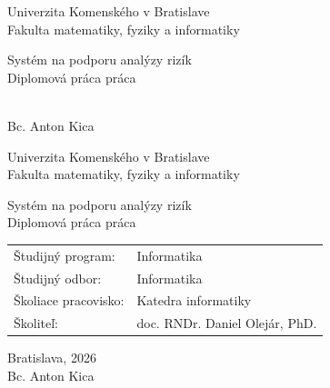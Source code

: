 \documentclass[12pt, twoside]{book}
\def\mfrok{2026}
\def\mfnazov{Systém na podporu analýzy rizík}
\def\mftyp{Diplomová práca práca}
\def\mfautor{Bc. Anton Kica}
\def\mfskolitel{doc. RNDr. Daniel Olejár, PhD.}
\def\mfmiesto{Bratislava, \mfrok}
\def\mfodbor{ Informatika }
\def\program{ Informatika }
\def\mfpracovisko{Katedra informatiky}
\begin{document}
     
\frontmatter
\pagestyle{empty}


\begin{center}
\sc\large
Univerzita Komenského v Bratislave\\
Fakulta matematiky, fyziky a informatiky

\vfill

{\LARGE\mfnazov}\\
\mftyp
\end{center}

\vfill

{\sc\large 
\noindent \mfrok\\
\mfautor
}

\cleardoublepage



\noindent

\begin{center}
\sc  
\large
Univerzita Komenského v Bratislave\\
Fakulta matematiky, fyziky a informatiky\usetikzlibrary{positioning, arrows.meta, calc, decorations.pathreplacing}

\vfill

{\LARGE\mfnazov}\\
\mftyp
\end{center}

\vfill

\noindent
\begin{tabular}{ll}
Študijný program: & \program \\
Študijný odbor: & \mfodbor \\
Školiace pracovisko: & \mfpracovisko \\
Školiteľ: & \mfskolitel \\
\end{tabular}

\vfill


\noindent \mfmiesto\\
\mfautor

\cleardoublepage


\end{document}
